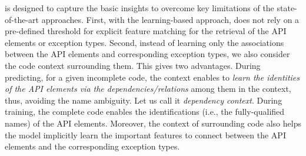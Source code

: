 {\tool} is designed to capture the basic insights to overcome key
limitations of the state-of-the-art approaches. First, with the
learning-based approach, {\tool} does not rely on a pre-defined
threshold for explicit feature matching for the retrieval of the API
elements or exception types. Second, instead of learning only the
associations between the API elements and corresponding exception
types, we also consider the code context surrounding them. This gives
{\tool} two advantages. During predicting, for a given incomplete
code, the context enables {\tool} to {\em learn the identities of the
  API elements via the dependencies/relations} among them in the
context, thus, avoiding the name ambiguity. Let us call it {\em
  dependency context}. During training, the complete code enables the
identifications (i.e., the fully-qualified names) of the API
elements. Moreover, the context of surrounding code also helps the
model implicitly learn the important features to connect between the
API elements and the corresponding exception types.


